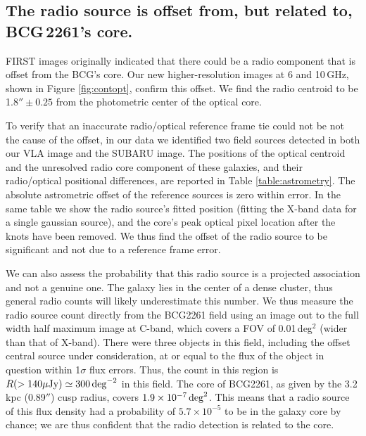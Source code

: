 \documentclass[useAMS,usenatbib]{emulateapj}
\newcommand{\src}{BCG\,2261}
\begin{document}
\subsection{The radio source is offset from, but related to, \src's core.}
FIRST images originally indicated that there could be a radio component that is offset from the BCG's core. Our new higher-resolution images at 6 and 10\,GHz, shown in Figure \ref{fig:contopt}, confirm this offset. We find the radio centroid to be 1.8$''\pm0.25$ from the photometric center of the optical core.

To verify that an inaccurate radio/optical reference frame tie could not be not the cause of the offset, in our data we identified two field sources detected in both our VLA image and the SUBARU image. The positions of the optical centroid and the unresolved radio core component of these galaxies, and their radio/optical positional differences, are reported in Table \ref{table:astrometry}. The absolute astrometric offset of the reference sources is zero within error. In the same table we show the radio source's fitted position (fitting the X-band data for a single gaussian source), and the core's peak optical pixel location after the knots have been removed. We thus find the offset of the radio source to be significant and not due to a reference frame error.

We can also assess the probability that this radio source is a projected association and not a genuine one. The galaxy lies in the center of a dense cluster, thus general radio counts will likely underestimate this number. We thus measure the radio source count directly from the BCG2261 field using an image out to the full width half maximum image at C-band, which covers a FOV of 
0.01\,deg$^2$ (wider than that of X-band). There were three objects in this field, including the offset central source under consideration, at or equal to the flux of the object in question within 1$\sigma$ flux errors. Thus, the count in this region is $R(>140\mu{\rm Jy})\simeq300\,{\rm deg}^{-2}$ in this field. The core of BCG2261, as given by the 3.2\,kpc (0.89$''$) cusp radius, covers $1.9\times10^{-7}\,{\rm deg}^2$. This means that a radio source of this flux density had a probability of $5.7\times10^{-5}$ to be in the galaxy core by chance; 
we are thus confident that the radio detection is related to the core.
\end{document}
